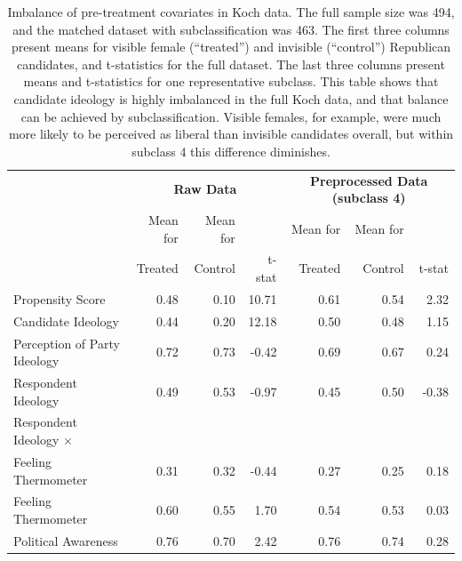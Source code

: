 \documentclass[11pt,titlepage]{article}
\newcommand{\MC}{\multicolumn}
\begin{document}
\begin{table}[t]
  \begin{center}
    \begin{tabular}{lrrrrrr}
      \hline
      & \MC{3}{c}{\bf Raw Data} & \MC{3}{c}{\bf Preprocessed Data
      (subclass 4) }\\
      & Mean for  & Mean for  &    & Mean for  & Mean for \\
      & Treated & Control  & t-stat &    Treated & Control  & t-stat \\
      \hline
      Propensity Score & 0.48 & 0.10 & 10.71 & 0.61 & 0.54 & 2.32 \\
      Candidate Ideology & 0.44 & 0.20 & 12.18 & 0.50 & 0.48 & 1.15 \\
      Perception of Party Ideology & 0.72 & 0.73 & -0.42 & 0.69 & 0.67 & 0.24 \\
      Respondent Ideology & 0.49 & 0.53 & -0.97 & 0.45 & 0.50 & -0.38 \\
      Respondent Ideology $\times$ \\
\hspace{0.1in} Feeling Thermometer  & 0.31 & 0.32 & -0.44 & 0.27 & 0.25 & 0.18\\
      Feeling Thermometer & 0.60 & 0.55 & 1.70 & 0.54 & 0.53 & 0.03 \\
      Political Awareness & 0.76 & 0.70 & 2.42 & 0.76 & 0.74 & 0.28 \\
      \hline
    \end{tabular}
    \caption{Imbalance of pre-treatment covariates in Koch data.
      The full sample size was 494, and the matched dataset with
      subclassification was 463.  The first three columns present
      means for visible female (``treated'') and invisible
      (``control'') Republican candidates, and t-statistics for the
      full dataset.  The last three columns present means and
      t-statistics for one representative subclass.  This table shows
      that candidate ideology is highly imbalanced in the full Koch
      data, and that balance can be achieved by subclassification.
      Visible females, for example, were much more likely to be
      perceived as liberal than invisible candidates overall, but
      within subclass 4 this difference diminishes.}
    \label{tb:kochmtest}
  \end{center}
\end{table}
\end{document}
